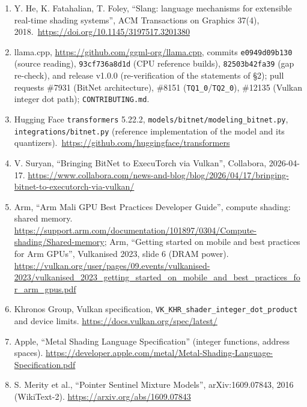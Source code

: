 \documentclass[
  10pt,
]{article}
\begin{document}
\begin{enumerate}
  W. M. McKeeman, ``Differential Testing for Software'', Digital
  Technical Journal 10(1), 100-107, 1998.
\item
  Y. He, K. Fatahalian, T. Foley, ``Slang: language mechanisms for
  extensible real-time shading systems'', ACM Transactions on Graphics
  37(4), 2018.\ \url{https://doi.org/10.1145/3197517.3201380}
\item
  llama.cpp, \url{https://github.com/ggml-org/llama.cpp}, commits
  \texttt{e0949d09b130} (source reading), \texttt{93cf736a8d1d} (CPU
  reference builds), \texttt{82503b42fa39} (gap re-check), and release
  v1.0.0 (re-verification of the statements of \S{}2); pull requests
  \#7931 (BitNet architecture), \#8151
  (\texttt{TQ1\_0}/\texttt{TQ2\_0}), \#12135 (Vulkan integer dot path);
  \texttt{CONTRIBUTING.md}.
\item
  Hugging Face \texttt{transformers} 5.22.2,
  \texttt{models/bitnet/modeling\_bitnet.py},
  \texttt{integrations/bitnet.py} (reference implementation of the model
  and its quantizers).\ \url{https://github.com/huggingface/transformers}
\item
  V. Suryan, ``Bringing BitNet to ExecuTorch via Vulkan'', Collabora,
  2026-04-17.
  \url{https://www.collabora.com/news-and-blog/blog/2026/04/17/bringing-bitnet-to-executorch-via-vulkan/}
\item
  Arm, ``Arm Mali GPU Best Practices Developer Guide'', compute shading:
  shared memory.
  \url{https://support.arm.com/documentation/101897/0304/Compute-shading/Shared-memory};
  Arm, ``Getting started on mobile and best practices for Arm GPUs'',
  Vulkanised 2023, slide 6 (DRAM power).
  \url{https://vulkan.org/user/pages/09.events/vulkanised-2023/vulkanised_2023_getting_started_on_mobile_and_best_practices_for_arm_gpus.pdf}
\item
  Khronos Group, Vulkan specification,
  \texttt{VK\_KHR\_shader\_integer\_dot\_product} and device limits.
  \url{https://docs.vulkan.org/spec/latest/}
\item
  Apple, ``Metal Shading Language Specification'' (integer functions,
  address spaces).
  \url{https://developer.apple.com/metal/Metal-Shading-Language-Specification.pdf}
\item
  S. Merity et al., ``Pointer Sentinel Mixture Models'',
  arXiv:1609.07843, 2016 (WikiText-2).
  \url{https://arxiv.org/abs/1609.07843}
\end{enumerate}
\end{document}
